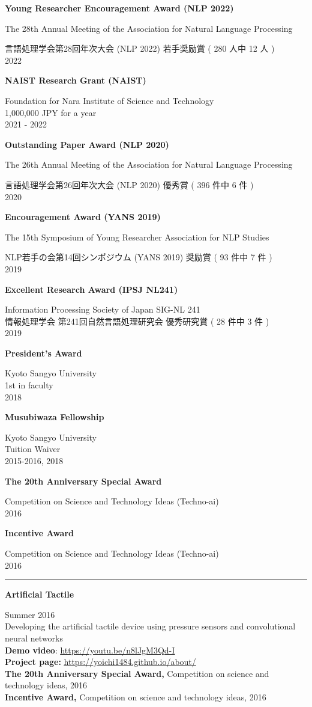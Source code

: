 \documentclass[11pt,letterpaper]{article}
\let\oldhref\href
\renewcommand{\href}[2]{\oldhref{#1}{\uline{#2}}}
\renewcommand{\url}[1]{\oldhref{#1}{\uline{#1}}}
\newlength{\labelcol}\setlength{\labelcol}{1.2in}
\newlength{\labelgap}\setlength{\labelgap}{0.21in}
\newcommand{\cvsection}[1]{%
  \par\vspace{26pt}%
  {\noindent\rule{\textwidth}{2.4pt}\par}\nopagebreak\vspace{9pt}%
  \noindent\llap{\smash[b]{\parbox[t]{\labelcol}{\raggedright\large\bfseries #1}}\hspace{\labelgap}}\ignorespaces}
\newcommand{\entry}[1]{\par\vspace{10pt}\noindent\textbf{#1}\par\nopagebreak}
\newcommand{\entryfirst}[1]{\textbf{#1}\par\nopagebreak}
\newenvironment{indented}{%
  \par\nopagebreak
  \begin{list}{}{\setlength{\leftmargin}{0.3in}\setlength{\topsep}{1pt}%
    \setlength{\partopsep}{0pt}\setlength{\itemsep}{0pt}\setlength{\parsep}{1pt}}\item[]}{\end{list}}
\newcommand{\awardline}[1]{{\par\raggedleft #1\par}}
\begin{document}
\entry{Young Researcher Encouragement Award (NLP 2022)}
The 28th Annual Meeting of the Association for Natural Language Processing
\awardline{言語処理学会第28回年次大会 (NLP 2022) 若手奨励賞 ( 280 人中 12 人 )\\ 2022}

\entry{NAIST Research Grant (NAIST)}
\awardline{Foundation for Nara Institute of Science and Technology\\ 1,000,000 JPY for a year\\ 2021 - 2022}

\entry{Outstanding Paper Award (NLP 2020)}
The 26th Annual Meeting of the Association for Natural Language Processing
\awardline{言語処理学会第26回年次大会 (NLP 2020) 優秀賞 ( 396 件中 6 件 )\\ 2020}

\entry{Encouragement Award (YANS 2019)}
The 15th Symposium of Young Researcher Association for NLP Studies
\awardline{NLP若手の会第14回シンポジウム (YANS 2019) 奨励賞 ( 93 件中 7 件 )\\ 2019}

\entry{Excellent Research Award (IPSJ NL241)}
\awardline{Information Processing Society of Japan SIG-NL 241\\ 情報処理学会 第241回自然言語処理研究会 優秀研究賞 ( 28 件中 3 件 )\\ 2019}

\entry{President's Award}
\awardline{Kyoto Sangyo University\\ 1st in faculty\\ 2018}

\entry{Musubiwaza Fellowship}
\awardline{Kyoto Sangyo University\\ Tuition Waiver\\ 2015-2016, 2018}

\entry{The 20th Anniversary Special Award}
\awardline{Competition on Science and Technology Ideas (Techno-ai)\\ 2016}

\entry{Incentive Award}
\awardline{Competition on Science and Technology Ideas (Techno-ai)\\ 2016}

\cvsection{Research Projects}%
\entryfirst{Artificial Tactile}
\begin{indented}
Summer 2016\\[3pt]
Developing the artificial tactile device using pressure sensors and convolutional neural networks\\
\textbf{Demo video}: \url{https://youtu.be/n8lJgM3Qd-I}\\[3pt]
\textbf{Project page:} \url{https://yoichi1484.github.io/about/}\\[3pt]
\textbf{The 20th Anniversary Special Award,} Competition on science and technology ideas, 2016\\[3pt]
\textbf{Incentive Award,} Competition on science and technology ideas, 2016
\end{indented}
\end{document}
